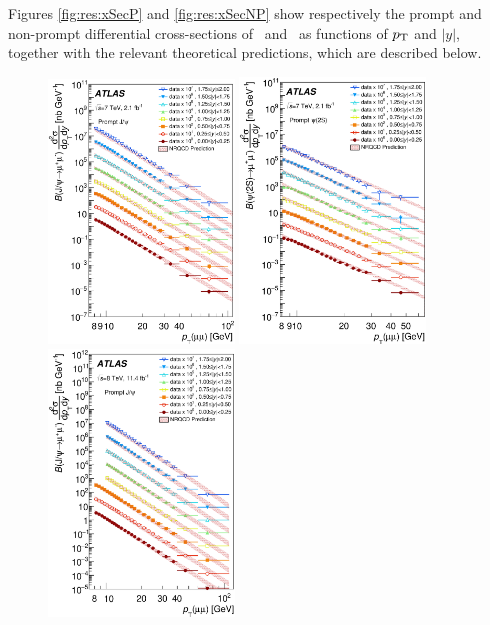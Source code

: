 \begin{description}[style=unboxed,leftmargin=0cm]


\item[Production cross-sections] \hfill

Figures \ref{fig:res:xSecP} and \ref{fig:res:xSecNP} show respectively the prompt and non-prompt 
differential cross-sections of \jpsi\ and \psiprime\ as functions of $\mbox{$p_{\text{T}}$}$ and $|y|$, together with the relevant theoretical predictions, 
which are described below.


\begin{figure} [!ht]
  \begin{center}
    \includegraphics[width=0.44\textwidth]{figures/ct_7TeV_JpsiP_xSec.eps} 
    \includegraphics[width=0.44\textwidth]{figures/ct_7TeV_Psi2SP_xSec.eps}\hfil\\
    \includegraphics[width=0.44\textwidth]{figures/ct_8TeV_JpsiP_xSec.eps}

\end{center}
\end{figure}
\end{description}
